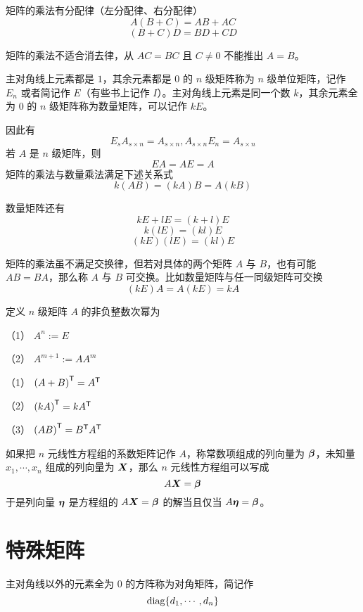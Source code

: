 \begin{theorem}
    矩阵的乘法有分配律（左分配律、右分配律）
    $$A(B+C) = AB+AC$$
    $$(B+C)D = BD + CD$$
\end{theorem}

矩阵的乘法不适合消去律，从 $AC = BC$ 且 $C\ne 0$ 不能推出 $A=B$。

主对角线上元素都是 $1$，其余元素都是 $0$ 的 $n$ 级矩阵称为 $n$ 级单位矩阵，记作 $E_n$ 或者简记作 $E$（有些书上记作 $I$）。主对角线上元素是同一个数 $k$，其余元素全为 $0$ 的 $n$ 级矩阵称为数量矩阵，可以记作 $kE$。

因此有
$$E_s A_{s\times n} = A_{s\times n}, A_{s\times n} E_n= A_{s\times n}$$
若 $A$ 是 $n$ 级矩阵，则
$$EA = AE = A$$
矩阵的乘法与数量乘法满足下述关系式
$$k(AB) = (kA)B = A(kB)$$

数量矩阵还有
$$kE + lE = (k+l)E$$
$$k(lE) = (kl)E$$
$$(kE)(lE) = (kl)E$$

矩阵的乘法虽不满足交换律，但若对具体的两个矩阵 $A$ 与 $B$，也有可能 $AB = BA$，那么称 $A$ 与 $B$ 可交换。比如数量矩阵与任一同级矩阵可交换
$$(kE)A = A(kE) = kA$$

\begin{definition}
    定义 $n$ 级矩阵 $A$ 的非负整数次幂为

    （1） $A^n := E$

    （2） $A^{m+1} := AA^m$
\end{definition}


\begin{theorem}
    （1） ${(A+B)}^\mathsf{T} = {A}^\mathsf{T}$
    
    （2） ${(kA)}^\mathsf{T} = k{A}^\mathsf{T}$
    
    （3） ${(AB)}^\mathsf{T} = {B}^\mathsf{T}{A}^\mathsf{T}$
\end{theorem}

如果把 $n$ 元线性方程组的系数矩阵记作 $A$，称常数项组成的列向量为 $\boldsymbol{\beta}$，未知量 $x_1,\cdots,x_n$ 组成的列向量为 $\boldsymbol{X}$，那么 $n$ 元线性方程组可以写成
$$A\boldsymbol{X} = \boldsymbol{\beta}$$
于是列向量 $\boldsymbol{\eta}$ 是方程组的 $A\boldsymbol{X} = \boldsymbol{\beta}$ 的解当且仅当 $A\boldsymbol{\eta} = \boldsymbol{\beta}$。

\section{特殊矩阵}

\begin{definition}
    主对角线以外的元素全为 $0$ 的方阵称为对角矩阵，简记作
    $$\operatorname{diag}\{d_1,\cdots,d_n\}$$
\end{definition}

